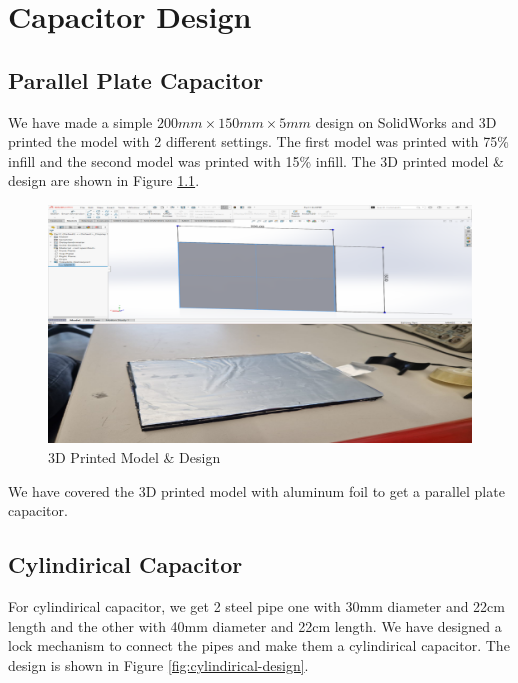\chapter{Capacitor Design}

\section{Parallel Plate Capacitor}

We have made a simple $200mm\times150mm\times5mm$ design on SolidWorks and 3D printed the model with 2 different settings. The first model was printed with 75\% infill and the second model was printed with 15\% infill. The 3D printed model \& design are shown in Figure \ref{fig:3d-printed-models}.

\begin{figure}[h]
    \centering
    \includegraphics[width=0.9\linewidth]{assets/parallel-plate-design.png}
    \caption{3D Printed Model \& Design}
    \label{fig:3d-printed-models}
\end{figure}

We have covered the 3D printed model with aluminum foil to get a parallel plate capacitor.

\newpage
\thispagestyle{plain}

\section{Cylindirical Capacitor}
For cylindirical capacitor, we get 2 steel pipe one with 30mm diameter and 22cm length and the other with 40mm diameter and 22cm length. We have designed a lock mechanism to connect the pipes and make them a cylindirical capacitor. The design is shown in Figure \ref{fig:cylindirical-design}.

